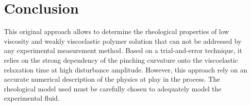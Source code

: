 \documentclass[twocolumn,10pt]{asme2ej}
\begin{document}
\section{Conclusion}
This original approach allows to determine the rheological properties of low viscosity and weakly viscoelastic polymer solution that can not be addressed by any experimental measurement method. Based on a trial-and-error technique, it relies on the strong dependency of the pinching curvature onto the viscoelastic relaxation time at high disturbance amplitude. However, this approach rely on an accurate numerical description of the physics at play in the process. The rheological model used must be carefully chosen to adequately model the experimental fluid.



\end{document}
